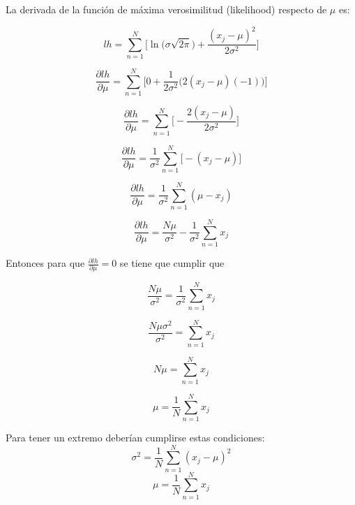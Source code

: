 \documentclass[a4paper,10pt]{article}
\begin{document}
La derivada de la función de máxima verosimilitud (likelihood) respecto de $\mu$ es:

\begin{equation*}
lh = \sum_{n = 1}^{N} \Big[ \ln{\big(  \sigma\sqrt{2\pi} \big)} + \frac{(x_j - \mu)^2}{2\sigma^2} \Big]
\end{equation*}

\begin{equation*}
\frac{\partial lh}{\partial \mu} = \sum_{n = 1}^{N} \Big[ 0 + \frac{1}{2\sigma^2} \big(2(x_j - \mu)(-1)\big) \Big]
\end{equation*}

\begin{equation*}
\frac{\partial lh}{\partial \mu} = \sum_{n = 1}^{N} \Big[-\frac{2(x_j - \mu)}{2\sigma^2}\Big]
\end{equation*}

\begin{equation*}
\frac{\partial lh}{\partial \mu} = \frac{1}{\sigma^2}\sum_{n = 1}^{N} \Big[-(x_j - \mu)\Big]
\end{equation*}

\begin{equation*}
\frac{\partial lh}{\partial \mu} = \frac{1}{\sigma^2}\sum_{n = 1}^{N} (\mu - x_j)
\end{equation*}

\begin{equation*}
\frac{\partial lh}{\partial \mu} = \frac{N\mu}{\sigma^2} - \frac{1}{\sigma^2}\sum_{n = 1}^{N} x_j
\end{equation*}

Entonces para que $\frac{\partial lh}{\partial \mu} = 0$ se tiene que cumplir que

\begin{equation*}
\frac{N\mu}{\sigma^2} = \frac{1}{\sigma^2}\sum_{n = 1}^{N} x_j
\end{equation*}

\begin{equation*}
\frac{N\mu\sigma^2}{\sigma^2} = \sum_{n = 1}^{N} x_j
\end{equation*}

\begin{equation*}
N\mu = \sum_{n = 1}^{N} x_j
\end{equation*}

\begin{equation*}
\mu = \frac{1}{N}\sum_{n = 1}^{N} x_j
\end{equation*}


Para tener un extremo deberían cumplirse estas condiciones:
\begin{equation*}
\sigma^2 = \frac{1}{N}\sum_{n = 1}^{N} (x_j - \mu)^2
\end{equation*}
\begin{equation*}
\mu = \frac{1}{N}\sum_{n = 1}^{N} x_j
\end{equation*}
\end{document}
